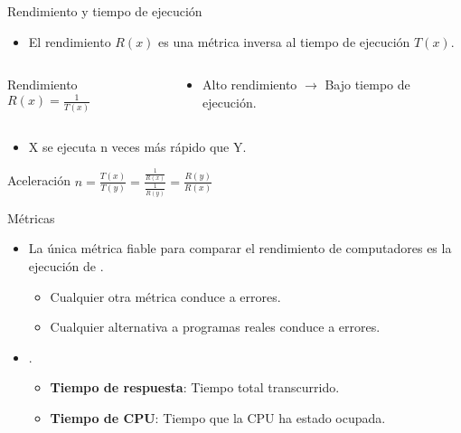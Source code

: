 \begin{frame}[t]{Rendimiento y tiempo de ejecución}
\begin{itemize}
  \item El rendimiento $R(x)$ es una métrica inversa al tiempo de 
        ejecución $T(x)$.
\end{itemize}
\begin{columns}
\begin{column}{.4\textwidth}
\begin{block}{Rendimiento}
\begin{math}
R(x) = \frac{1}{T(x)}
\end{math}
\end{block}
\end{column}
\begin{column}{.6\textwidth}
\begin{itemize}
  \item Alto rendimiento $\rightarrow$ Bajo tiempo de ejecución.
\end{itemize}
\end{column}
\end{columns}
\begin{itemize}
  \item X se ejecuta n veces más rápido que Y.
\end{itemize}
\begin{block}{Aceleración}
\begin{math}
n=\frac{T(x)}{T(y)}=
\frac{
\frac{1}{R(x)}
}{
\frac{1}{R(y)}
}
=
\frac{R(y)}{R(x)}
\end{math}
\end{block}
\end{frame}

\begin{frame}[t]{Métricas}
\begin{itemize}
  \item La \alert{única} métrica fiable para comparar el rendimiento de computadores 
        es la ejecución de .
    \begin{itemize}
      \item Cualquier otra métrica conduce a errores.
      \item Cualquier alternativa a programas reales conduce a errores.
    \end{itemize}
  \item {}.
    \begin{itemize}
      \item \textbf{Tiempo de respuesta}: 
            Tiempo total transcurrido.
      \item \textbf{Tiempo de CPU}: 
            Tiempo que la CPU ha estado ocupada.
    \end{itemize}
\end{itemize}
\end{frame}

